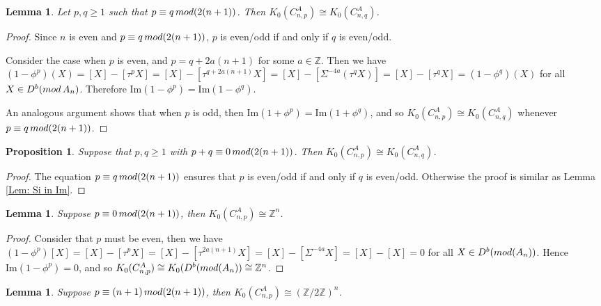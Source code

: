 \documentclass[a4paper,reqno,11pt]{amsart}
\newtheorem{lemma}[theorem]{Lemma}
\newtheorem{proposition}[theorem]{Proposition}
\theoremstyle{definition}
\renewcommand{\mod}{\mathop{\rm mod}\nolimits}%
\begin{document}
\begin{lemma}\label{Lem: n even, p,q equiv}
	Let $p,q \geq 1$ such that $p \equiv q \mod (2(n+1))$. Then $K_0(C_{n,p}^A) \cong K_0(C_{n,q}^A)$.
\end{lemma}
\begin{proof}
Since $n$ is even and  $p \equiv q \mod (2(n+1))$,  $p$ is even/odd if and only if $q$ is even/odd.
	
	Consider the case when $p$ is even, and $p = q +2a(n+1)$ for some $a \in \mathbb{Z}$.
	Then we have $(1 - \phi^p)(X) = [X] - [\tau^p X] = [X] - [\tau^{q + 2a(n+1)}X] = [X] - [\Sigma^{-4a} (\tau^q X)] = [X] - [\tau^q X] = (1 - \phi^q)(X)$ for all $X \in D^b(\mod {A_n})$.
	Therefore $\mathrm{Im}(1 - \phi^p) = \mathrm{Im}(1 - \phi^q)$.
	
	An analogous argument shows that when $p$ is odd, then $\mathrm{Im}(1 + \phi^p) = \mathrm{Im}(1 + \phi^q)$, and so $K_0(C_{n,p}^A) \cong K_0(C_{n,q}^A)$ whenever $p \equiv q \mod (2(n+1))$.
\end{proof}


\begin{proposition}\label{11}
	Suppose that $p,q \geq 1$ with $p+q \equiv 0 \mod (2(n+1))$.
	Then $K_0(C_{n,p}^A) \cong K_0(C_{n,q}^A)$.
\end{proposition}
\begin{proof}
The equation $p \equiv q \mod (2(n+1))$ ensures that $p$ is even/odd if and only if $q$ is even/odd. Otherwise the proof is similar as Lemma \ref{Lem: Si in Im}.
\end{proof}

\begin{lemma}\label{Lem: n even, p equiv 0}
	Suppose $p \equiv 0 \mod (2(n+1))$, then $K_0(C_{n,p}^A) \cong \mathbb{Z}^n$.
\end{lemma}

\begin{proof}
	Consider that $p$ must be even, then we have $(1 - \phi^p) [X] = [X] - [\tau^p X] = [X] - [\tau^{2a(n+1)} X] = [X] - [\Sigma^{-4a} X] =  [X] - [X] = 0$ for all $X \in D^b(\mod (A_n))$.
	Hence $\mathrm{Im}(1 - \phi^p) =0$, and so $K_0(C_{n,p}^A) \cong K_0( D^b(\mod (A_n)) \cong \mathbb{Z}^n$.
\end{proof}

\begin{lemma}\label{Lem: n even, p equiv n+1}
	Suppose $p \equiv (n+1) \mod (2(n+1))$, then $K_0(C_{n,p}^A) \cong (\mathbb{Z}/2\mathbb{Z})^n$.
\end{lemma}
\end{document}
